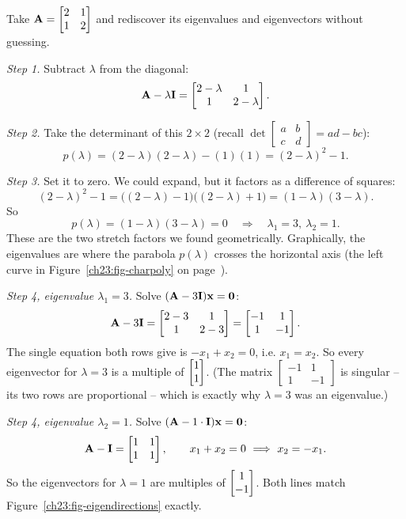 \begin{example}
\label{ch23:ex-running}
Take $\mathbf{A}=\begin{bmatrix}2&1\\1&2\end{bmatrix}$ and rediscover its
eigenvalues and eigenvectors without guessing.

\emph{Step 1.} Subtract $\lambda$ from the diagonal:
\[
  \mathbf{A}-\lambda\mathbf{I}=\begin{bmatrix}2-\lambda & 1\\ 1 & 2-\lambda\end{bmatrix}.
\]

\emph{Step 2.} Take the determinant of this $2\times 2$ (recall
$\det\begin{bmatrix}a&b\\c&d\end{bmatrix}=ad-bc$):
\[
  p(\lambda)=(2-\lambda)(2-\lambda)-(1)(1)=(2-\lambda)^2-1.
\]

\emph{Step 3.} Set it to zero. We could expand, but it factors as a
difference of squares:
\[
  (2-\lambda)^2-1=\bigl((2-\lambda)-1\bigr)\bigl((2-\lambda)+1\bigr)=(1-\lambda)(3-\lambda).
\]
So
\[
  p(\lambda)=(1-\lambda)(3-\lambda)=0\quad\Longrightarrow\quad
  \lambda_1=3,\ \lambda_2=1.
\]
These are the two stretch factors we found geometrically. Graphically, the
eigenvalues are where the parabola $p(\lambda)$ crosses the horizontal axis (the
left curve in Figure~\ref{ch23:fig-charpoly} on page~\pageref{ch23:fig-charpoly}).

\emph{Step 4, eigenvalue $\lambda_1=3$.} Solve
$(\mathbf{A}-3\mathbf{I})\mathbf{x}=\mathbf{0}$:
\[
  \mathbf{A}-3\mathbf{I}=\begin{bmatrix}2-3 & 1\\ 1 & 2-3\end{bmatrix}
  =\begin{bmatrix}-1 & 1\\ 1 & -1\end{bmatrix}.
\]
The single equation both rows give is $-x_1+x_2=0$, i.e. $x_1=x_2$. So every
eigenvector for $\lambda=3$ is a multiple of $\begin{bmatrix}1\\1\end{bmatrix}$. (The matrix
$\begin{bmatrix}-1&1\\1&-1\end{bmatrix}$ is singular -- its two rows are
proportional -- which is exactly why $\lambda=3$ was an eigenvalue.)

\emph{Step 4, eigenvalue $\lambda_2=1$.} Solve
$(\mathbf{A}-1\cdot\mathbf{I})\mathbf{x}=\mathbf{0}$:
\[
  \mathbf{A}-\mathbf{I}=\begin{bmatrix}1 & 1\\ 1 & 1\end{bmatrix},\qquad
  x_1+x_2=0\ \Longrightarrow\ x_2=-x_1.
\]
So the eigenvectors for $\lambda=1$ are multiples of $\begin{bmatrix}1\\-1\end{bmatrix}$. Both lines
match Figure~\ref{ch23:fig-eigendirections} exactly.
\end{example}

